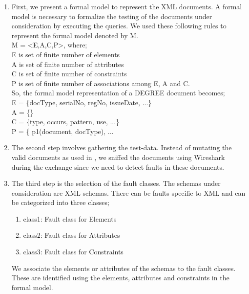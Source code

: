 \documentclass[12pt,a4paper,oneside]{book}
\begin{document}
	\begin{enumerate}  

		\item First, we present a formal model to represent the XML documents. A formal model is necessary to formalize the testing of the documents under consideration by executing the queries. We used these following rules to represent the formal model denoted by M. \\
		M = \textless E,A,C,P\textgreater , where; \\
		E is set of finite number of elements \\
		A is set of finite number of attributes \\
		C is set of finite number of constraints \\
		P is set of finite number of associations among E, A and C. \\
		
		So, the formal model representation of a DEGREE document becomes; \\
		E = \{docType, serialNo, regNo, issueDate, ...\} \\
		A = \{\} \\
		C = \{type, occurs, pattern, use, ...\} \\
		P = \{ p1(document, docType), ...

		\item The second step involves gathering the test-data. Instead of mutating the valid documents as used in \cite{Testing XML Schemas} \cite{Fault based Testing}, we sniffed the documents using Wireshark during the exchange since we need to detect faults in these documents. 
		
	
		\item The third step is the selection of the fault classes. The schemas under consideration are XML schemas. There can be faults specific to XML and can be categorized into three classes;
		
		\begin{enumerate} 
			\item class1: Fault class for Elements
			\item class2: Fault class for Attributes
			\item class3: Fault class for Constraints
		\end{enumerate}
		
		We associate the elements or attributes of the schemas to the fault classes. These are identified using the elements, attributes and constraints in the formal model.		
		

\end{enumerate}
\end{document}
